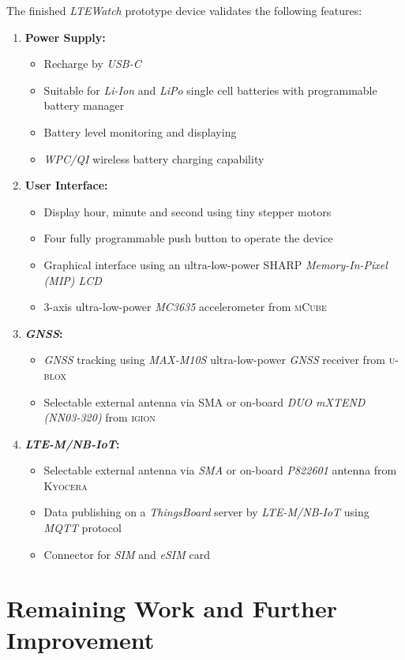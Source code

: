 \documentclass[Report.tex]{subfiles}
\begin{document}
The finished \textit{LTEWatch} prototype device validates the following features:
\begin{enumerate}
\item \textbf{Power Supply:}
\begin{itemize}
\item Recharge by \textit{USB-C}
\item Suitable for \textit{Li-Ion} and \textit{LiPo} single cell batteries with programmable battery manager
\item Battery level monitoring and displaying
\item \textit{WPC/QI} wireless battery charging capability
\end{itemize}
\item \textbf{User Interface:}
\begin{itemize}
\item Display hour, minute and second using tiny stepper motors
\item Four fully programmable push button to operate the device
\item Graphical interface using an ultra-low-power \textsc{SHARP} \textit{Memory-In-Pixel (MIP) LCD}
\item 3-axis ultra-low-power \textit{MC3635} accelerometer from \textsc{mCube}
\end{itemize}
\item \textbf{\textit{GNSS}:}
\begin{itemize}
\item \textit{GNSS} tracking using \textit{MAX-M10S} ultra-low-power \textit{GNSS} receiver from \textsc{u-blox}
\item Selectable external antenna via SMA or on-board \textit{DUO mXTEND (NN03-320)} from \textsc{igion}
\end{itemize}
\item \textbf{\textit{LTE-M/NB-IoT}:}
\begin{itemize}
\item Selectable external antenna via \textit{SMA} or on-board \textit{P822601} antenna from \textsc{Kyocera}
\item Data publishing on a \textit{ThingsBoard} server by \textit{LTE-M/NB-IoT} using \textit{MQTT} protocol
\item Connector for \textit{SIM} and \textit{eSIM} card
\end{itemize}
\end{enumerate}

\pagebreak

\section{Remaining Work and Further Improvement}
\end{document}
